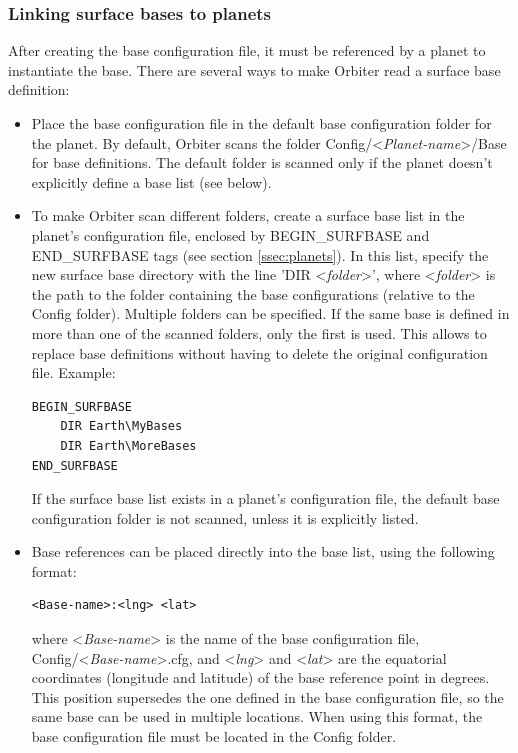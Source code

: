 \documentclass[Orbiter Developer Manual.tex]{subfiles}
\begin{document}
\subsubsection*{Linking surface bases to planets}
After creating the base configuration file, it must be referenced by a planet to instantiate the base. There are several ways to make Orbiter read a surface base definition:

\begin{itemize}
\item Place the base configuration file in the default base configuration folder for the planet. By default, Orbiter scans the folder Config/<\textit{Planet-name}>/Base for base definitions. The default folder is scanned only if the planet doesn't explicitly define a base list (see below).
\item To make Orbiter scan different folders, create a surface base list in the planet's configuration file, enclosed by BEGIN\_SURFBASE and END\_SURFBASE tags (see section \ref{ssec:planets}). In this list, specify the new surface base directory with the line 'DIR <\textit{folder}>', where <\textit{folder}> is the path to the folder containing the base configurations (relative to the Config folder). Multiple folders can be specified. If the same base is defined in more than one of the scanned folders, only the first is used. This allows to replace base definitions without having to delete the original configuration file. Example:

\begin{lstlisting}[language=OSFS]
BEGIN_SURFBASE
	DIR Earth\MyBases
	DIR Earth\MoreBases
END_SURFBASE
\end{lstlisting}

\noindent
If the surface base list exists in a planet's configuration file, the default base configuration folder is not scanned, unless it is explicitly listed.
\item Base references can be placed directly into the base list, using the following format:\\

\begin{lstlisting}[language=OSFS]
<Base-name>:<lng> <lat>
\end{lstlisting}

\noindent
where <\textit{Base-name}> is the name of the base configuration file, Config/<\textit{Base-name}>.cfg, and <\textit{lng}> and <\textit{lat}> are the equatorial coordinates (longitude and latitude) of the base reference point in degrees. This position supersedes the one defined in the base configuration file, so the same base can be used in multiple locations. When using this format, the base configuration file must be located in the Config folder.
\end{itemize}
\end{document}
